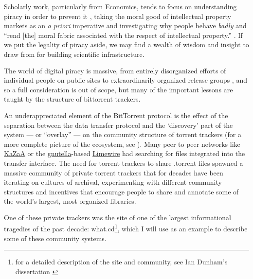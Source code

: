 \documentclass[notoc]{tufte-book}
\begin{document}
Scholarly work, particularly from Economics, tends to focus on
understanding piracy in order to prevent it\citep{basamanowiczReleaseGroupsDigital2011, hindujaDeindividuationInternetSoftware2008} , taking the moral good
of intellectual property markets as an \emph{a priori} imperative and
investigating why people behave \emph{badly} and ``rend {[}the{]} moral
fabric associated with the respect of intellectual property.'' \citep{hindujaDeindividuationInternetSoftware2008} . If we put the legality
of piracy aside, we may find a wealth of wisdom and insight to draw from
for building scientific infrastructure.

The world of digital piracy is massive, from entirely disorganized
efforts of individual people on public sites to extraordinarily
organized release groups \citep{basamanowiczReleaseGroupsDigital2011} , and so a full consideration is out of scope, but many of the
important lessons are taught by the structure of bittorrent trackers.

An underappreciated element of the BitTorrent protocol is the effect of
the separation between the data transfer protocol and the `discovery'
part of the system --- or ``overlay'' --- on the community structure of
torrent trackers (for a more complete picture of the ecosystem, see \citep{zhangUnravelingBitTorrentEcosystem2011} ). Many peer to peer
networks like \href{https://en.wikipedia.org/wiki/Kazaa}{KaZaA} or the
\href{https://en.wikipedia.org/wiki/Gnutella}{gnutella}-based
\href{https://en.wikipedia.org/wiki/LimeWire}{Limewire} had searching
for files integrated into the transfer interface. The need for torrent
trackers to share .torrent files spawned a massive community of private
torrent trackers that for decades have been iterating on cultures of
archival, experimenting with different community structures and
incentives that encourage people to share and annotate some of the
world's largest, most organized libraries.

One of these private trackers was the site of one of the largest
informational tragedies of the past decade: what.cd\footnote{for a
  detailed description of the site and community, see Ian Dunham's
  dissertation \citep{dunhamWhatCDLegacy2018} }, which I will use
as an example to describe some of these community systems.
\end{document}
